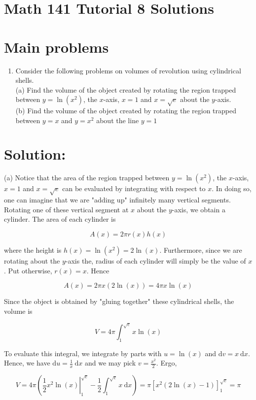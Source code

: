\documentclass[10pt]{article}
\begin{document}
\section*{Math 141 Tutorial 8 Solutions}
\section*{Main problems}
\begin{enumerate}
  \item Consider the following problems on volumes of revolution using cylindrical shells.\\
(a) Find the volume of the object created by rotating the region trapped between $y=\ln \left(x^{2}\right)$, the $x$-axis, $x=1$ and $x=\sqrt{e}$ about the $y$-axis.\\
(b) Find the volume of the object created by rotating the region trapped between $y=x$ and $y=x^{2}$ about the line $y=1$
\end{enumerate}

\section*{Solution:}
(a) Notice that the area of the region trapped between $y=\ln \left(x^{2}\right)$, the $x$-axis, $x=1$ and $x=\sqrt{e}$ can be evaluated by integrating with respect to $x$. In doing so, one can imagine that we are "adding up" infinitely many vertical segments. Rotating one of these vertical segment at $x$ about the $y$-axis, we obtain a cylinder. The area of each cylinder is

$$
A(x)=2 \pi r(x) h(x)
$$

where the height is $h(x)=\ln \left(x^{2}\right)=2 \ln (x)$. Furthermore, since we are rotating about the $y$-axis the, radius of each cylinder will simply be the value of $x$. Put otherwise, $r(x)=x$. Hence

$$
A(x)=2 \pi x(2 \ln (x))=4 \pi x \ln (x)
$$

Since the object is obtained by "gluing together" these cylindrical shells, the volume is

$$
V=4 \pi \int_{1}^{\sqrt{e}} x \ln (x)
$$

To evaluate this integral, we integrate by parts with $u=\ln (x)$ and $\mathrm{d} v=x \mathrm{~d} x$. Hence, we have $\mathrm{d} u=\frac{1}{x} \mathrm{~d} x$ and we may pick $v=\frac{x^{2}}{2}$. Ergo,

$$
V=4 \pi\left(\left.\frac{1}{2} x^{2} \ln (x)\right|_{1} ^{\sqrt{e}}-\frac{1}{2} \int_{1}^{\sqrt{e}} x \mathrm{~d} x\right)=\pi\left[x^{2}(2 \ln (x)-1)\right]_{1}^{\sqrt{e}}=\pi
$$
\end{document}
